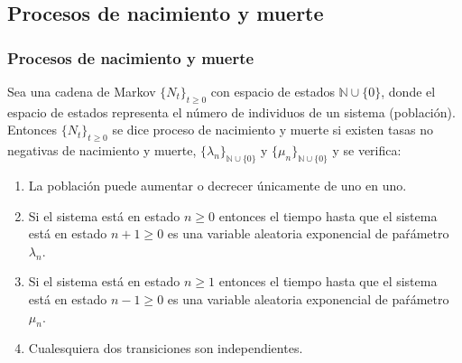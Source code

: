 \documentclass[8pt]{beamer}
\begin{document}
  \subsection{Procesos de nacimiento y muerte}
  \begin{frame}\frametitle{Procesos de nacimiento y muerte}
    Sea una cadena de Markov $\{N_t\}_{t\ge 0}$ con espacio de estados $\mathbb{N}\cup \{0\}$, donde el espacio de estados representa el número de individuos
    de un sistema (población). Entonces $\{N_t\}_{t\ge 0}$ se dice proceso de nacimiento y muerte si existen tasas no negativas de nacimiento y muerte,
    $\{\lambda_n\}_{\mathbb{N}\cup \{0\}}$ y $\{\mu_n\}_{\mathbb{N}\cup \{0\}}$ y se verifica:
    \begin{enumerate}
    \item La población puede aumentar o decrecer únicamente de uno en uno.
    \item Si el sistema está en estado $n\ge 0$ entonces el tiempo hasta que el sistema está en estado $n+1 \ge 0$ es una variable aleatoria exponencial
      de paŕámetro $\lambda_n$.
    \item Si el sistema está en estado $n\ge 1$ entonces el tiempo hasta que el sistema está en estado $n-1 \ge 0$ es una variable aleatoria exponencial
      de paŕámetro $\mu_n$.
    \item Cualesquiera dos transiciones son independientes.
    \end{enumerate}
  \end{frame}
\end{document}
